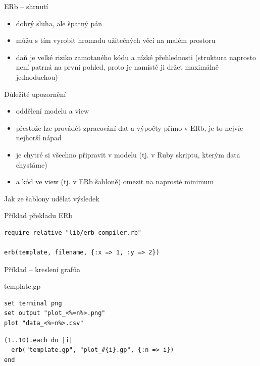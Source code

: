 \documentclass{beamer}
\begin{document}
\begin{frame}{ERb -- shrnutí}
  \begin{itemize}
    \item dobrý sluha, ale špatný pán
    \item můžu s tím vyrobit hromadu užitečných věcí na malém prostoru
    \item daň je velké riziko zamotaného kódu a nízké přehlednosti (struktura naprosto není patrná na první pohled, proto je namístě ji držet maximálně jednoduchou)
  \end{itemize}
\end{frame}

\begin{frame}{Důležité upozornění}
  \begin{itemize}
    \item oddělení modelu a view
    \item přestože lze provádět zpracování dat a výpočty přímo v ERb, je to nejvíc nejhorší nápad
    \item je chytré si všechno připravit v modelu (tj. v Ruby skriptu, kterým data chystáme)
    \item a kód ve view (tj. v ERb šabloně) omezit na naprosté minimum
  \end{itemize}
\end{frame}

\begin{frame}[fragile]{Jak ze šablony udělat výsledek}
  \scriptsize
  \begin{block}{Příklad překladu ERb}
    \scriptsize
    \begin{verbatim}
require_relative "lib/erb_compiler.rb"

erb(template, filename, {:x => 1, :y => 2})
    \end{verbatim}
  \end{block}
\end{frame}

\begin{frame}[fragile]{Příklad -- kreslení grafůa}
  \begin{block}{template.gp}
    \scriptsize
    \begin{verbatim}
set terminal png
set output "plot_<%=n%>.png"
plot "data_<%=n%>.csv"
    \end{verbatim}
  \end{block}
  \begin{block}{}
    \scriptsize
    \begin{verbatim}
(1..10).each do |i|
  erb("template.gp", "plot_#{i}.gp", {:n => i})
end
    \end{verbatim}
  \end{block}
\end{frame}
\end{document}
